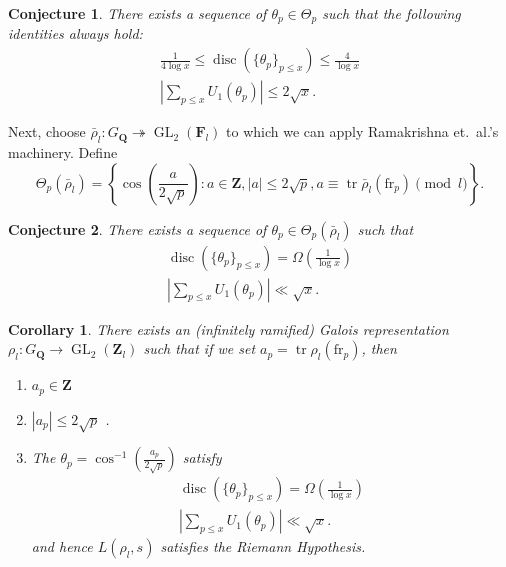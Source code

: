 \documentclass{article}
\DeclareMathOperator{\disc}{disc}
\DeclareMathOperator{\GL}{GL}
\DeclareMathOperator{\tr}{tr}
\newcommand{\bF}{\mathbf{F}}
\newcommand{\bQ}{\mathbf{Q}}
\newcommand{\bZ}{\mathbf{Z}}
\newcommand{\fr}{\mathrm{fr}}
\newtheorem{corollary}{Corollary}
\newtheorem{conjecture}{Conjecture}
\begin{document}
\begin{conjecture}
There exists a sequence of $\theta_p\in \Theta_p$ such that the following 
identities always hold:
\begin{align*}
	\frac{1}{4\log x} \leqslant \disc(\{\theta_p\}_{p\leqslant x}) \leqslant \frac{4}{\log x} \\
	\left| \sum_{p\leqslant x} U_1(\theta_p)\right| \leqslant 2 \sqrt{x} .
\end{align*}
\end{conjecture}

Next, choose $\bar\rho_l \colon G_\bQ \twoheadrightarrow \GL_2(\bF_l)$ to 
which we can apply Ramakrishna et.~al.'s machinery. Define 
\[
	\Theta_p(\bar\rho_l) = \left\{\cos\left(\frac{a}{2\sqrt p}\right) : a\in \bZ, |a|\leqslant 2\sqrt p, a \equiv \tr \bar\rho_l(\fr_p)\pmod l\right\} .
\]
\begin{conjecture}
There exists a sequence of $\theta_p\in \Theta_p(\bar\rho_l)$ such that 
\begin{align*}
	\disc(\{\theta_p\}_{p\leqslant x}) =\Omega\left( \frac{1}{\log x} \right)\\
	\left| \sum_{p\leqslant x} U_1(\theta_p)\right| \ll \sqrt{x} .
\end{align*}
\end{conjecture}

\begin{corollary}
There exists an (infinitely ramified) Galois representation 
$\rho_l\colon G_\bQ \to \GL_2(\bZ_l)$ such that if we set 
$a_p = \tr\rho_l(\fr_p)$, then 
\begin{enumerate}
\item
$a_p\in \bZ$
\item
$|a_p| \leqslant 2\sqrt p$ .
\item
The $\theta_p = \cos^{-1}\left(\frac{a_p}{2\sqrt p}\right)$ satisfy 
\begin{align*}
	\disc(\{\theta_p\}_{p\leqslant x}) =\Omega\left( \frac{1}{\log x} \right)\\
	\left| \sum_{p\leqslant x} U_1(\theta_p)\right| \ll \sqrt{x} .
\end{align*}
and hence $L(\rho_l,s)$ satisfies the Riemann Hypothesis. 
\end{enumerate}
\end{corollary}
\end{document}
